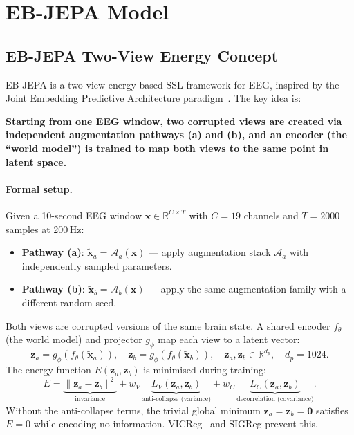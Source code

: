 \documentclass[11pt,a4paper]{article}
\begin{document}
\section{EB-JEPA Model}
\label{sec:jepa}

\subsection{EB-JEPA Two-View Energy Concept}
\label{sec:jepa_concept}

EB-JEPA is a two-view energy-based SSL framework for EEG, inspired by the Joint Embedding
Predictive Architecture paradigm~\cite{ijepa,lecun2022}.  The key idea is:

\textbf{Starting from one EEG window, two corrupted views are created via independent
augmentation pathways (a) and (b), and an encoder (the ``world model'') is trained to
map both views to the same point in latent space.}

\paragraph{Formal setup.}
Given a 10-second EEG window $\mathbf{x} \in \mathbb{R}^{C \times T}$ with $C{=}19$ channels
and $T{=}2000$ samples at 200\,Hz:
\begin{itemize}[noitemsep]
  \item \textbf{Pathway (a)}: $\tilde{\mathbf{x}}_a = \mathcal{A}_a(\mathbf{x})$ --- apply
    augmentation stack $\mathcal{A}_a$ with independently sampled parameters.
  \item \textbf{Pathway (b)}: $\tilde{\mathbf{x}}_b = \mathcal{A}_b(\mathbf{x})$ --- apply
    the same augmentation family with a different random seed.
\end{itemize}
Both views are corrupted versions of the same brain state.  A shared encoder $f_\theta$
(the world model) and projector $g_\phi$ map each view to a latent vector:
\begin{equation}
  \mathbf{z}_a = g_\phi(f_\theta(\tilde{\mathbf{x}}_a)), \quad
  \mathbf{z}_b = g_\phi(f_\theta(\tilde{\mathbf{x}}_b)), \quad
  \mathbf{z}_a, \mathbf{z}_b \in \mathbb{R}^{d_p}, \quad d_p{=}1024.
\end{equation}
The energy function $E(\mathbf{z}_a, \mathbf{z}_b)$ is minimised during training:
\begin{equation}
  E = \underbrace{\|\mathbf{z}_a - \mathbf{z}_b\|^2}_{\text{invariance}}
    + w_V\, \underbrace{L_V(\mathbf{z}_a, \mathbf{z}_b)}_{\text{anti-collapse (variance)}}
    + w_C\, \underbrace{L_C(\mathbf{z}_a, \mathbf{z}_b)}_{\text{decorrelation (covariance)}}.
\end{equation}
Without the anti-collapse terms, the trivial global minimum $\mathbf{z}_a = \mathbf{z}_b = \mathbf{0}$
satisfies $E{=}0$ while encoding no information.  VICReg~\cite{vicreg} and SIGReg prevent this.
\end{document}
